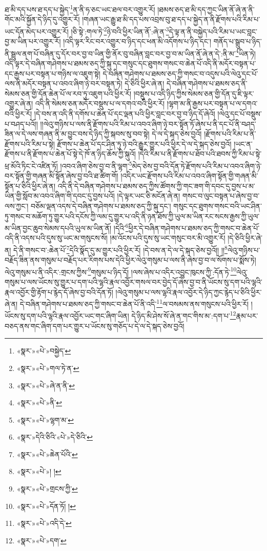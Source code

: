 ཐ་མི་དད་པས་ཐ་དད་པ་སྐྱེད་\footnote{«སྣར་»«པེ་»བསྐྱེད་}ན་ནི་ཧ་ཅང་ཡང་ཐལ་བར་འགྱུར་རོ། །ཐམས་ཅད་ཐ་མི་དད་ཀྱང་ཡིན་ནོ་ཞེ་ན་ནི་གོང་མའི་སྐྱོན་དེ་ཉིད་དུ་འགྱུར་རོ། །གཞན་ཡང་རྒྱུ་ཐ་མི་དད་པས་འབྲས་བུ་ཐ་དད་པ་སྐྱེད་ན་ནི་རྫོགས་པའི་རིམ་པ་ཡང་དོན་མེད་པར་འགྱུར་རོ། །ཅི་སྟེ་:གལ་ཏེ་\footnote{«སྣར་»«པེ་»གལ་ཏེ་ན་}ཉེ་བའི་ཕྱིར་ཡིན་ནོ་:ཞེ་ན་\footnote{«སྣར་»«པེ་»ཞེ་ན་ནི་}དེ་ལྟ་ན་ནི་བསྐྱེད་པའི་རིམ་པ་ཡང་བླང་བྱ་མ་ཡིན་པར་འགྱུར་རོ། །འདི་ལྟར་རིང་བར་འགྱུར་བ་ཉིད་དང་ཕན་མི་འདོགས་པ་ཉིད་དང་། གནོད་པ་སྒྲུབ་པ་ཉིད་ནི་སྦྲུལ་ནག་པོ་བཞིན་དུ་དོར་བར་བྱ་བ་ཡིན་གྱི་ནོར་བུ་བཞིན་བླང་བར་བྱ་བ་མ་ཡིན་ནོ་ཞེ་ན་དེ་:ནི་མ་\footnote{«སྣར་»«པེ་»ནི་}ཡིན་ཏེ། འདི་ལྟར་དེ་བཞིན་གཤེགས་པ་ཐམས་ཅད་ཀྱི་སྐུ་དང་གསུང་དང་ཐུགས་གསང་བ་ཆེན་པོ་འདི་ནི་མདོར་བསྟན་པ་དང་རྒྱས་པར་བསྟན་པ་གཉིས་ལ་འཇུག་སྟེ། དེ་བཞིན་གཤེགས་པ་ཐམས་ཅད་ཀྱི་གསང་བ་འདུས་པའི་ལེའུ་དང་པོ་ལས་ནི་མདོར་བསྟན་པ་འབའ་ཞིག་ཉེ་བར་བསྟན་ཏེ། དེ་ཅིའི་ཕྱིར་ཞེ་ན། དེ་བཞིན་གཤེགས་པ་ཐམས་ཅད་ནི་སེམས་ཅན་གྱི་དོན་ཆེན་པོ་ལ་རབ་ཏུ་འཇུག་པའི་ཕྱིར་རོ། །བསྡུས་པ་འདི་ཉིད་ཀྱིས་སེམས་ཅན་གྱི་དོན་དུ་ཇི་ལྟར་འགྱུར་ཞེ་ན། འདི་ནི་སེམས་ཅན་མདོར་བསྡུས་པ་ལ་དགའ་བའི་ཕྱིར་རོ། །ལྷག་མ་ནི་རྒྱས་པར་བསྟན་པ་ལ་དགའ་བའི་ཕྱིར་རོ། །དེ་བས་ན་འདི་ནི་དགོས་པ་ཆེན་པོ་དང་ལྡན་པའི་ཕྱིར་བླང་བར་བྱ་བ་ཉིད་དོ་ཞེའོ། །ལེའུ་དང་པོ་བསྡུས་པ་བཤད་པའོ།། །།ལེའུ་གཉིས་པ་ལས་ནི་རྫོགས་པའི་རིམ་པ་འབའ་ཞིག་ཉེ་བར་སྟོན་ཏོ་ཞེས་པ་ནི་དང་པོ་ནི་བཤད་ཟིན་ལ་དེ་ལས་གཞན་ནི་མ་བྱུང་བས་དེ་ཉིད་ཀྱི་སྐབས་སུ་བབ་སྟེ། དེ་ལ་དེ་སྐད་ཅེས་བྱའོ། །རྫོགས་པའི་རིམ་པ་ནི་རྫོགས་པའི་རིམ་པ་སྟེ། རྫོགས་པ་ཆེན་པོ་དང་ཤིན་ཏུ་ཉེ་བའི་རྒྱུར་གྱུར་པའི་ཕྱིར་དེ་ལ་དེ་སྐད་ཅེས་བྱའོ། །ཡང་ན་རྫོགས་པ་ནི་རྫོགས་པ་ཆེན་པོ་སྟེ་དེ་ཁོ་ན་ཉིད་ཆོས་ཀྱི་སྐུའོ། །དེའི་རིམ་པ་ནི་རྫོགས་པ་ཐོབ་པའི་ཐབས་ཀྱི་རིམ་པ་སྟེ་ཕྲ་མོའི་ཏིང་ངེ་འཛིན་ཏོ། །འབའ་ཞིག་ཅེས་བྱ་བ་ནི་ལྷག་\footnote{«སྣར་»«པེ་»ལྷག་མ་}མེད་ཅེས་བྱ་བའི་དོན་ཏེ་རྫོགས་པའི་རིམ་པ་འབའ་ཞིག་ཉེ་བར་སྟོན་གྱི་གཞན་མི་སྟོན་ཞེས་བྱ་བའི་ཐ་ཚིག་གོ། །འདིར་ཡང་རྫོགས་པའི་རིམ་པ་འབའ་ཞིག་སྟོན་གྱི་གཞན་མི་སྟོན་པ་ཅིའི་ཕྱིར་ཞེ་ན། འདི་ནི་དེ་བཞིན་གཤེགས་པ་ཐམས་ཅད་ཀྱིས་ཚོགས་ཀྱི་གང་ཟག་གི་དབང་དུ་བྱས་པ་མ་ཡིན་གྱི་སློབ་མ་འབའ་ཞིག་གི་དབང་དུ་བྱས་པའོ། །དེ་ལྟར་ཡང་ཅི་མངོན་ཞེ་ན། གསང་བ་ལུང་བསྟན་པ་ཞེས་བྱ་བ་ལས་ཀྱང་། བཅོམ་ལྡན་འདས་དེ་བཞིན་གཤེགས་པ་ཐམས་ཅད་ཀྱི་སྐུ་དང་། གསུང་དང་ཐུགས་གསང་བའི་ཡང་ཤིན་ཏུ་གསང་བ་མཆོག་ཏུ་གྱུར་པའི་དངོས་ཀྱི་ལམ་དུ་གྱུར་པ་འདི་ནི་ཉན་ཐོས་ཀྱི་ཡུལ་མ་ཡིན་རང་སངས་རྒྱས་ཀྱི་ཡུལ་མ་ཡིན་བྱང་ཆུབ་སེམས་དཔའི་ཡུལ་མ་ཡིན་ནོ། །དེའི་\footnote{«སྣར་»དེའི་ཅིའི་«པེ་»དེ་ཅིའི་}ཕྱིར་དེ་བཞིན་གཤེགས་པ་ཐམས་ཅད་ཀྱི་གསང་བ་ཆེན་པོ་འདི་ནི་འདས་པའི་དུས་སུ་ཡང་མ་གསུངས་སོ། །མ་འོངས་པའི་དུས་སུ་ཡང་གསུང་བར་མི་འགྱུར་རོ། །དེ་ཅིའི་ཕྱིར་ཞེ་ན། དེ་ནི་གསང་བ་:ཆེན་པོ་\footnote{«སྣར་»«པེ་»ཆེན་པོའི་}དེའི་སྣོད་དུ་མ་གྱུར་པའི་ཕྱིར་རོ། །དེ་བས་ན་དེ་ལ་དེ་སྐད་ཅེས་བྱའོ།། །།\footnote{«སྣར་»«པེ་»། །}ལེའུ་གཉིས་པ་བརྗོད་ཟིན་ནས་གསུམ་པ་བརྗོད་པར་རིགས་པས་དེའི་ཕྱིར་ལེའུ་གསུམ་པ་ལས་ནི་ཞེས་བྱ་བ་ལ་སོགས་པ་སྨོས་ཏེ། ལེའུ་གསུམ་པ་ནི་འདིར་:གྲངས་ཀྱིས་\footnote{«སྣར་»«པེ་»གྲངས་ཀྱི་}གསུམ་པ་ཉིད་དོ། །ལས་ཞེས་པ་འདིར་འབྱུང་ཁུངས་ཀྱི་:དོན་ཏེ་\footnote{«སྣར་»«པེ་»དོན་ཏོ། །}ལེའུ་གསུམ་པ་ལས་ཡོངས་སུ་གྱུར་པ་དག་པའི་ལྷའི་རྣལ་འབྱོར་གསལ་བར་བྱེད་དོ་ཞེས་བྱ་བ་ནི་ཡོངས་སུ་དག་པའི་ལྷའི་རྣལ་འབྱོར་གྱི་རྟོག་པ་རྙེད་དོ་ཞེས་བྱ་བའི་དོན་ཏོ། །ལེའུ་གསུམ་པ་ལས་ལྷའི་རྣལ་འབྱོར་དེ་ཉིད་ཀྱང་རྙེད་པ་ཅིའི་ཕྱིར་ཞེ་ན། དེ་བཞིན་གཤེགས་པ་ཐམས་ཅད་ཀྱི་གསང་བ་ཆེན་པོ་ནི་འདི་\footnote{«སྣར་»«པེ་»འདི་དེ་}ལ་བསམས་ནས་གསུངས་པའི་ཕྱིར་རོ། །ཡོངས་སུ་དག་པའི་ལྷའི་རྣལ་འབྱོར་ཡང་གང་ཞིག་ཡིན། དེ་ཉིད་མི་ཤེས་སོ་ཞེ་ན་གང་གིས་མ་:དག་པ་\footnote{«སྣར་»«པེ་»དག་}རྣམ་པར་བཅད་ནས་གང་ཞིག་དག་པར་གྱུར་པ་ཡོངས་སུ་གཅོད་པ་དེ་ལ་དེ་སྐད་ཅེས་བྱའོ། 